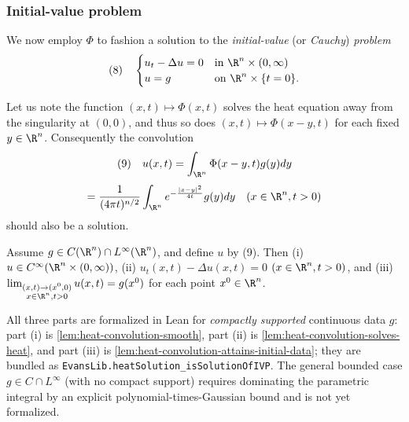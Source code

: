 \subsubsection{Initial-value problem}
\label{sec:heat-initial-value-problem}

We now employ $\Phi$ to fashion a solution to the \textit{initial-value} (or \textit{Cauchy}) \textit{problem}
$$(8) \quad \begin{cases} u_t - \Delta u = 0 & \text{in } \R^n \times (0,\infty) \\ u = g & \text{on } \R^n \times \{t = 0\}. \end{cases}$$

Let us note the function $(x,t) \mapsto \Phi(x,t)$ solves the heat equation away from the singularity at $(0,0)$, and thus so does $(x,t) \mapsto \Phi(x-y,t)$ for each fixed $y \in \R^n$. Consequently the convolution
$$(9) \quad u(x,t) = \int_{\R^n} \Phi(x-y,t)g(y) dy$$
$$= \frac{1}{(4\pi t)^{n/2}} \int_{\R^n} e^{-\frac{|x-y|^2}{4t}} g(y) dy \quad (x \in \R^n, t > 0)$$
should also be a solution.

\begin{theorem}
\label{thm:heat-equation-initial-value-solution}
Assume $g \in C(\R^n) \cap L^\infty(\R^n)$, and define $u$ by (9). Then
(i) $u \in C^\infty(\R^n \times (0,\infty))$,
(ii) $u_t(x,t) - \Delta u(x,t) = 0$ $(x \in \R^n, t > 0)$,
and
(iii) $\lim_{\substack{(x,t) \to (x^0,0) \\ x \in \R^n, t > 0}} u(x,t) = g(x^0)$ for each point $x^0 \in \R^n$.

All three parts are formalized in Lean for \emph{compactly supported} continuous
data $g$: part (i) is \cref{lem:heat-convolution-smooth}, part (ii) is
\cref{lem:heat-convolution-solves-heat}, and part (iii) is
\cref{lem:heat-convolution-attains-initial-data}; they are bundled as
\texttt{EvansLib.heatSolution\_isSolutionOfIVP}. The general bounded case
$g\in C\cap L^\infty$ (with no compact support) requires dominating the parametric
integral by an explicit polynomial-times-Gaussian bound and is not yet formalized.
\end{theorem}


